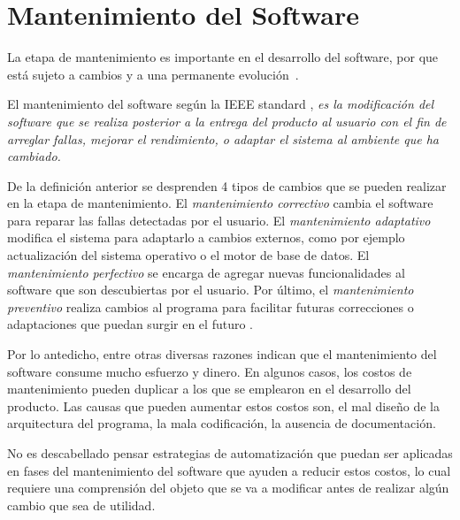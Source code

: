 \documentclass[a4paper,12pt]{report}
\begin{document}
\section{Mantenimiento del Software}

La etapa de mantenimiento es importante en el desarrollo del software, por que está sujeto a cambios y a una permanente \mbox{evolución \cite{PFT02}.}

El mantenimiento del software según la IEEE standard \cite{STD610}, \textit{es la mo\-dificación del software que se realiza posterior a la entrega del producto al usuario con el fin de arreglar fallas, mejorar el rendimiento, o adaptar el sistema al ambiente que ha cambiado.}

De la definición anterior se desprenden 4 tipos de cambios que se pueden realizar en la etapa de mantenimiento. El \textit{mantenimiento correctivo} cambia el software para reparar las fallas detectadas por el usuario. El \textit{mantenimiento adaptativo} modifica el sistema para adaptarlo a cambios externos, como por ejemplo actualización del sistema operativo o el motor de base de datos. El \textit{ mantenimiento perfectivo} se encarga de agregar nuevas funcionalidades al software que son descubiertas por el usuario. Por último, el \textit{mantenimiento preventivo} realiza cambios al programa para facilitar futuras correcciones o adaptaciones que puedan surgir en el futuro \cite{RSPMGH02}.


Por lo antedicho, entre otras diversas razones \cite{KBVR00} indican que el man\-tenimiento del software consume mucho esfuerzo y dinero. En algunos casos, los costos de mantenimiento pueden duplicar a los que se emplearon en el desarro\-llo del producto. Las causas que pueden aumentar estos costos son, el mal diseño de la arquitectura del programa, la mala codificación, la ausencia de documentación.

No es descabellado pensar estrategias de automatización que puedan ser aplicadas en fases del mantenimiento del software que ayuden a reducir estos costos, lo cual requiere una comprensión del objeto que se va a modificar antes de realizar algún cambio que sea de utilidad.
 
\end{document}
